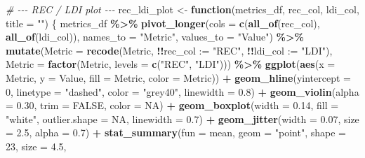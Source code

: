 \documentclass[
]{article}
\newenvironment{Shaded}{\begin{snugshade}}{\end{snugshade}}
\newcommand{\AttributeTok}[1]{\textcolor[rgb]{0.13,0.29,0.53}{#1}}
\newcommand{\CommentTok}[1]{\textcolor[rgb]{0.56,0.35,0.01}{\textit{#1}}}
\newcommand{\ConstantTok}[1]{\textcolor[rgb]{0.56,0.35,0.01}{#1}}
\newcommand{\ControlFlowTok}[1]{\textcolor[rgb]{0.13,0.29,0.53}{\textbf{#1}}}
\newcommand{\DecValTok}[1]{\textcolor[rgb]{0.00,0.00,0.81}{#1}}
\newcommand{\FloatTok}[1]{\textcolor[rgb]{0.00,0.00,0.81}{#1}}
\newcommand{\FunctionTok}[1]{\textcolor[rgb]{0.13,0.29,0.53}{\textbf{#1}}}
\newcommand{\NormalTok}[1]{#1}
\newcommand{\OtherTok}[1]{\textcolor[rgb]{0.56,0.35,0.01}{#1}}
\newcommand{\SpecialCharTok}[1]{\textcolor[rgb]{0.81,0.36,0.00}{\textbf{#1}}}
\newcommand{\StringTok}[1]{\textcolor[rgb]{0.31,0.60,0.02}{#1}}
\begin{document}
\begin{Shaded}
\begin{Highlighting}[]
\CommentTok{\# {-}{-}{-} REC / LDI plot {-}{-}{-}}
\NormalTok{rec\_ldi\_plot }\OtherTok{\textless{}{-}} \ControlFlowTok{function}\NormalTok{(metrics\_df, rec\_col, ldi\_col, }\AttributeTok{title =} \StringTok{""}\NormalTok{) \{}
\NormalTok{  metrics\_df }\SpecialCharTok{\%\textgreater{}\%}
    \FunctionTok{pivot\_longer}\NormalTok{(}\AttributeTok{cols =} \FunctionTok{c}\NormalTok{(}\FunctionTok{all\_of}\NormalTok{(rec\_col), }\FunctionTok{all\_of}\NormalTok{(ldi\_col)),}
                 \AttributeTok{names\_to =} \StringTok{"Metric"}\NormalTok{, }\AttributeTok{values\_to =} \StringTok{"Value"}\NormalTok{) }\SpecialCharTok{\%\textgreater{}\%}
    \FunctionTok{mutate}\NormalTok{(}\AttributeTok{Metric =} \FunctionTok{recode}\NormalTok{(Metric, }\SpecialCharTok{!!}\AttributeTok{rec\_col :=} \StringTok{"REC"}\NormalTok{, }\SpecialCharTok{!!}\AttributeTok{ldi\_col :=} \StringTok{"LDI"}\NormalTok{),}
           \AttributeTok{Metric =} \FunctionTok{factor}\NormalTok{(Metric, }\AttributeTok{levels =} \FunctionTok{c}\NormalTok{(}\StringTok{"REC"}\NormalTok{, }\StringTok{"LDI"}\NormalTok{))) }\SpecialCharTok{\%\textgreater{}\%}
    \FunctionTok{ggplot}\NormalTok{(}\FunctionTok{aes}\NormalTok{(}\AttributeTok{x =}\NormalTok{ Metric, }\AttributeTok{y =}\NormalTok{ Value, }\AttributeTok{fill =}\NormalTok{ Metric, }\AttributeTok{color =}\NormalTok{ Metric)) }\SpecialCharTok{+}
    \FunctionTok{geom\_hline}\NormalTok{(}\AttributeTok{yintercept =} \DecValTok{0}\NormalTok{, }\AttributeTok{linetype =} \StringTok{"dashed"}\NormalTok{, }\AttributeTok{color =} \StringTok{"grey40"}\NormalTok{, }\AttributeTok{linewidth =} \FloatTok{0.8}\NormalTok{) }\SpecialCharTok{+}
    \FunctionTok{geom\_violin}\NormalTok{(}\AttributeTok{alpha =} \FloatTok{0.30}\NormalTok{, }\AttributeTok{trim =} \ConstantTok{FALSE}\NormalTok{, }\AttributeTok{color =} \ConstantTok{NA}\NormalTok{) }\SpecialCharTok{+}
    \FunctionTok{geom\_boxplot}\NormalTok{(}\AttributeTok{width =} \FloatTok{0.14}\NormalTok{, }\AttributeTok{fill =} \StringTok{"white"}\NormalTok{, }\AttributeTok{outlier.shape =} \ConstantTok{NA}\NormalTok{, }\AttributeTok{linewidth =} \FloatTok{0.7}\NormalTok{) }\SpecialCharTok{+}
    \FunctionTok{geom\_jitter}\NormalTok{(}\AttributeTok{width =} \FloatTok{0.07}\NormalTok{, }\AttributeTok{size =} \FloatTok{2.5}\NormalTok{, }\AttributeTok{alpha =} \FloatTok{0.7}\NormalTok{) }\SpecialCharTok{+}
    \FunctionTok{stat\_summary}\NormalTok{(}\AttributeTok{fun =}\NormalTok{ mean, }\AttributeTok{geom =} \StringTok{"point"}\NormalTok{, }\AttributeTok{shape =} \DecValTok{23}\NormalTok{, }\AttributeTok{size =} \FloatTok{4.5}\NormalTok{,}

\end{Highlighting}
\end{Shaded}
\end{document}
